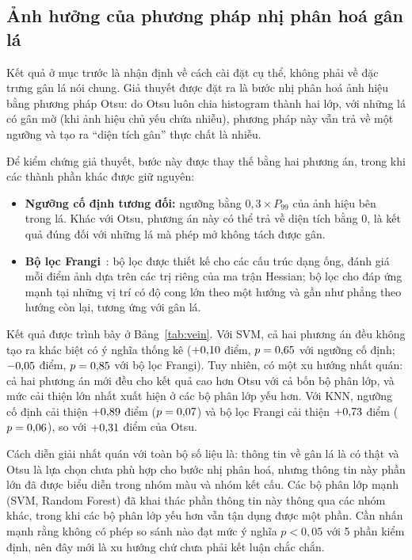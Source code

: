 \documentclass[11pt,a4paper]{article}
\begin{document}
\subsection{Ảnh hưởng của phương pháp nhị phân hoá gân lá}
\label{sec:veinvariants}

Kết quả ở mục trước là nhận định về cách cài đặt cụ thể, không phải về đặc trưng gân lá nói chung.
Giả thuyết được đặt ra là bước nhị phân hoá ảnh hiệu bằng phương pháp Otsu: do Otsu luôn chia
histogram thành hai lớp, với những lá có gân mờ (khi ảnh hiệu chủ yếu chứa nhiễu), phương pháp này
vẫn trả về một ngưỡng và tạo ra ``diện tích gân'' thực chất là nhiễu.

Để kiểm chứng giả thuyết, bước này được thay thế bằng hai phương án, trong khi các thành phần khác được
giữ nguyên:
\begin{itemize}
  \item \textbf{Ngưỡng cố định tương đối:} ngưỡng bằng $0{,}3 \times P_{99}$ của ảnh hiệu bên trong lá.
        Khác với Otsu, phương án này có thể trả về diện tích bằng 0, là kết quả đúng đối với những lá
        mà phép mở không tách được gân.
  \item \textbf{Bộ lọc Frangi}~\cite{frangi1998}: bộ lọc được thiết kế cho các cấu trúc dạng ống, đánh
        giá mỗi điểm ảnh dựa trên các trị riêng của ma trận Hessian; bộ lọc cho đáp ứng mạnh tại những
        vị trí có độ cong lớn theo một hướng và gần như phẳng theo hướng còn lại, tương ứng với gân lá.
\end{itemize}

Kết quả được trình bày ở Bảng~\ref{tab:vein}. Với SVM, cả hai phương án đều không tạo ra khác biệt có
ý nghĩa thống kê ($+0{,}10$ điểm, $p = 0{,}65{}$ với ngưỡng cố định; $-0{,}05$ điểm,
$p = 0{,}85{}$ với bộ lọc Frangi). Tuy nhiên, có một xu hướng nhất quán: cả hai phương án mới
đều cho kết quả cao hơn Otsu với cả bốn bộ phân lớp, và mức cải thiện lớn nhất xuất hiện ở các bộ phân
lớp yếu hơn. Với KNN, ngưỡng cố định cải thiện $+0{,}89$ điểm ($p = 0{,}07{}$) và bộ lọc
Frangi cải thiện $+0{,}73$ điểm ($p = 0{,}06{}$), so với $+0{,}31$ điểm của Otsu.

Cách diễn giải nhất quán với toàn bộ số liệu là: thông tin về gân lá là có thật và Otsu là lựa chọn
chưa phù hợp cho bước nhị phân hoá, nhưng thông tin này phần lớn đã được biểu diễn trong nhóm màu và
nhóm kết cấu. Các bộ phân lớp mạnh (SVM, Random Forest) đã khai thác phần thông tin này thông qua các
nhóm khác, trong khi các bộ phân lớp yếu hơn vẫn tận dụng được một phần. Cần nhấn mạnh rằng không có
phép so sánh nào đạt mức ý nghĩa $p < 0{,}05$ với 5 phần kiểm định, nên đây mới là xu hướng chứ chưa
phải kết luận chắc chắn.
\end{document}

